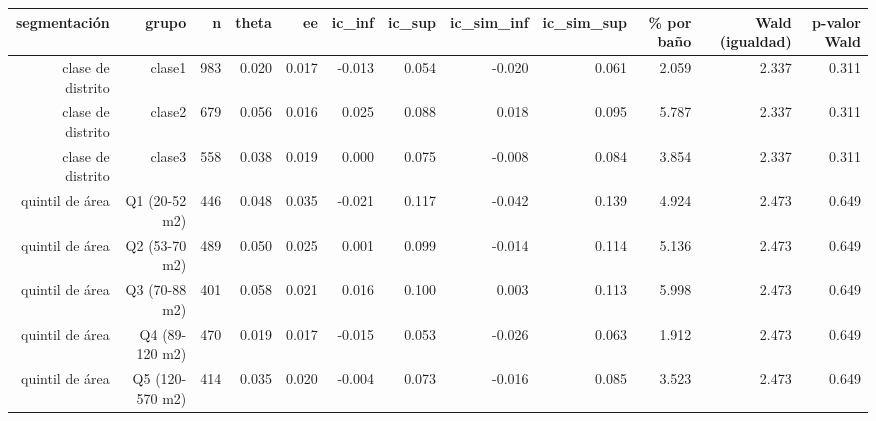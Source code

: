 \begin{tabular}{rrrrrrrrrrrr}
\toprule
segmentación & grupo & n & theta & ee & ic\_inf & ic\_sup & ic\_sim\_inf & ic\_sim\_sup & \% por baño & Wald (igualdad) & p-valor Wald \\
\midrule
clase de distrito & clase1 & 983 & 0.020 & 0.017 & -0.013 & 0.054 & -0.020 & 0.061 & 2.059 & 2.337 & 0.311 \\
clase de distrito & clase2 & 679 & 0.056 & 0.016 & 0.025 & 0.088 & 0.018 & 0.095 & 5.787 & 2.337 & 0.311 \\
clase de distrito & clase3 & 558 & 0.038 & 0.019 & 0.000 & 0.075 & -0.008 & 0.084 & 3.854 & 2.337 & 0.311 \\
quintil de área & Q1 (20-52 m2) & 446 & 0.048 & 0.035 & -0.021 & 0.117 & -0.042 & 0.139 & 4.924 & 2.473 & 0.649 \\
quintil de área & Q2 (53-70 m2) & 489 & 0.050 & 0.025 & 0.001 & 0.099 & -0.014 & 0.114 & 5.136 & 2.473 & 0.649 \\
quintil de área & Q3 (70-88 m2) & 401 & 0.058 & 0.021 & 0.016 & 0.100 & 0.003 & 0.113 & 5.998 & 2.473 & 0.649 \\
quintil de área & Q4 (89-120 m2) & 470 & 0.019 & 0.017 & -0.015 & 0.053 & -0.026 & 0.063 & 1.912 & 2.473 & 0.649 \\
quintil de área & Q5 (120-570 m2) & 414 & 0.035 & 0.020 & -0.004 & 0.073 & -0.016 & 0.085 & 3.523 & 2.473 & 0.649 \\
\bottomrule
\end{tabular}